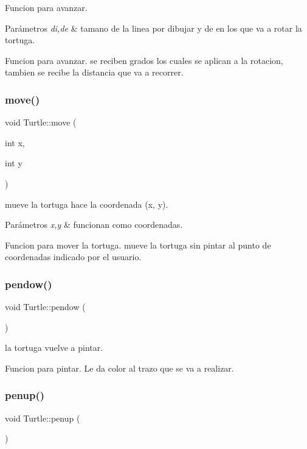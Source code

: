 Funcion para avanzar. 
\begin{DoxyParams}{Parámetros}
{\em di,de} & tamano de la linea por dibujar y de en los que va a rotar la tortuga.\\
\hline
\end{DoxyParams}
Funcion para avanzar. se reciben grados los cuales se aplican a la rotacion, tambien se recibe la distancia que va a recorrer. \mbox{\label{classTurtle_ac77d9bd08853112cccfc27962fef4759}} 
\subsubsection{\texorpdfstring{move()}{move()}}
{\footnotesize\ttfamily void Turtle\+::move (\begin{DoxyParamCaption}\item[{int}]{x,  }\item[{int}]{y }\end{DoxyParamCaption})}

mueve la tortuga hace la coordenada (x, y). 
\begin{DoxyParams}{Parámetros}
{\em x,y} & funcionan como coordenadas.\\
\hline
\end{DoxyParams}
Funcion para mover la tortuga. mueve la tortuga sin pintar al punto de coordenadas indicado por el usuario. \mbox{\label{classTurtle_aabe573f505a789dfe84fc2219ec0cb10}} 
\subsubsection{\texorpdfstring{pendow()}{pendow()}}
{\footnotesize\ttfamily void Turtle\+::pendow (\begin{DoxyParamCaption}{ }\end{DoxyParamCaption})}

la tortuga vuelve a pintar.

Funcion para pintar. Le da color al trazo que se va a realizar. \mbox{\label{classTurtle_a40367ef16bd84c7d382992b8e6d3a9fc}} 
\subsubsection{\texorpdfstring{penup()}{penup()}}
{\footnotesize\ttfamily void Turtle\+::penup (\begin{DoxyParamCaption}{ }\end{DoxyParamCaption})}

